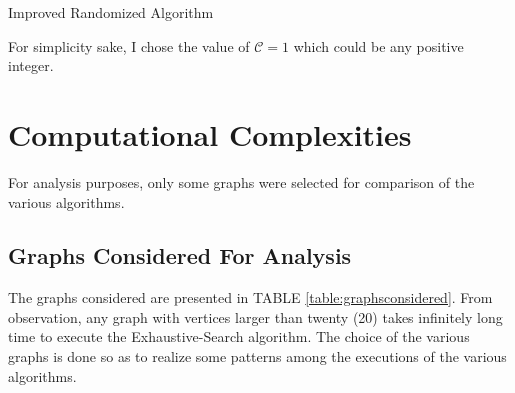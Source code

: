\documentclass[longpaper, english, final, times]{revdetua}
\begin{document}
			\begin{algorithm}[h]
				\caption{Improved Randomized Algorithm}
				\label{algorithm:ImprovedProbabilisticRandomized}
				\DontPrintSemicolon
				
				
				
				
			\end{algorithm}
		
		For simplicity sake, I chose the value of $\mathcal{C}=1$ which could be any positive integer.
		
	\section{Computational Complexities}
		For analysis purposes, only some graphs were selected for comparison of the various algorithms. 
		
		\subsection{Graphs Considered For Analysis}
			The graphs considered are presented in TABLE \ref{table:graphsconsidered}. From observation, any graph with vertices larger than twenty (20) takes infinitely long time to execute the Exhaustive-Search algorithm. The choice of the various graphs is done so as to realize some patterns among the executions of the various algorithms.
			
\end{document}
